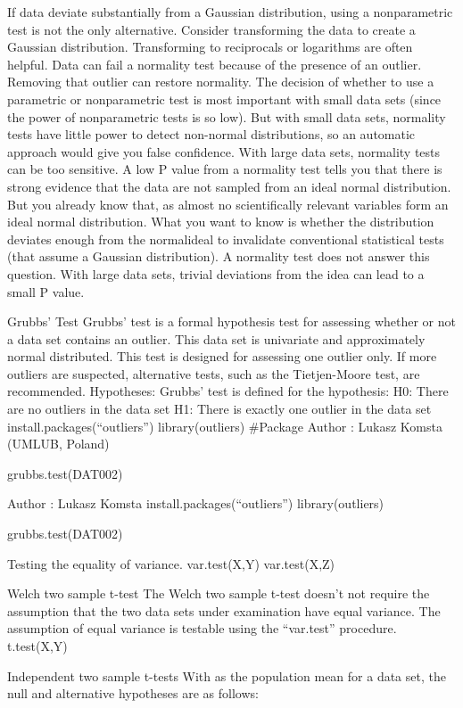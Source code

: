 If data deviate substantially from a Gaussian distribution, using a nonparametric test is not the only alternative. Consider transforming the data to create a Gaussian distribution. Transforming to reciprocals or logarithms are often helpful.
Data can fail a normality test because of the presence of an outlier. Removing that outlier can restore normality.
The decision of whether to use a parametric or nonparametric test is most important with small data sets (since the power of nonparametric tests is so low). But with small data sets, normality tests have little power to detect non-normal distributions, so an automatic approach would give you false confidence.
With large data sets, normality tests can be too sensitive. A low P value from a normality test tells you that there is strong evidence that the data are not sampled from an ideal normal distribution. But you already know that, as almost no scientifically relevant variables form an ideal normal distribution. What you want to know is whether the distribution deviates enough from the normalideal to invalidate conventional statistical tests (that assume a Gaussian distribution). A normality test does not answer this question. With large data sets, trivial deviations from the idea can lead to a small P value.
 
Grubbs’ Test
Grubbs' test is a formal hypothesis test for assessing whether or not a  data set contains an outlier.
This data set is univariate and approximately normal distributed. This test is designed for assessing one outlier only.  If more outliers are suspected, alternative tests, such as the Tietjen-Moore test, are recommended.
Hypotheses: Grubbs' test is defined for the hypothesis: 
H0:  There are no outliers in the data set  
H1:  There is exactly one outlier in the data set  
install.packages(“outliers”)
library(outliers)
#Package Author : Lukasz Komsta (UMLUB, Poland)

grubbs.test(DAT002)

Author : Lukasz Komsta
install.packages(“outliers”)
library(outliers)

grubbs.test(DAT002)

Testing the equality of variance.
var.test(X,Y)
var.test(X,Z)

Welch two sample t-test
The Welch two sample t-test doesn’t not require the assumption that the two data sets under examination have equal variance.
The assumption of equal variance is testable using the “var.test” procedure.
t.test(X,Y)


Independent two sample t-tests
With    as the population mean for a data set, the null and alternative hypotheses are as follows:
 
